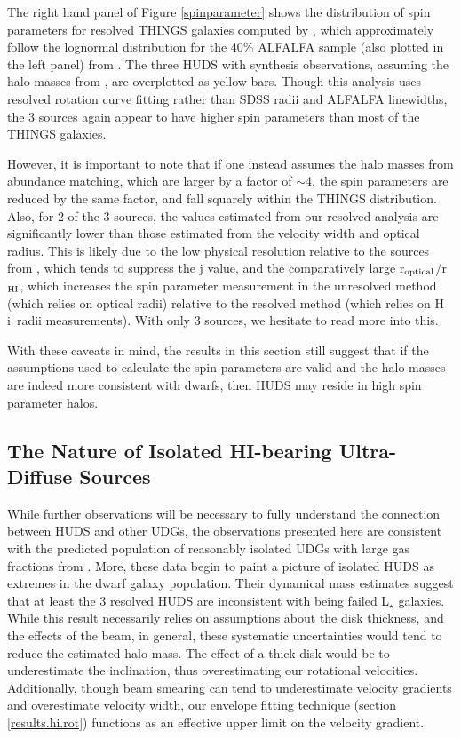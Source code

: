 \documentclass[twocolumn]{aastex6}
\newcommand{\hi}{H{\sc\,i}}
\begin{document}
The right hand panel of Figure \ref{spinparameter} shows the distribution of spin parameters for resolved THINGS galaxies computed by \cite{hallenbeck14a}, which approximately follow the lognormal distribution for the 40\% ALFALFA sample (also plotted in the left panel) from \cite{huang12b}.  The three HUDS with synthesis observations, assuming the halo masses from \cite{dicintio16a}, are overplotted as yellow bars. Though this analysis uses resolved rotation curve fitting rather than SDSS radii and ALFALFA linewidths, the 3 sources again appear to have higher spin parameters than most of the THINGS galaxies. 

However, it is important to note that if one instead assumes the halo masses from abundance matching, which are larger by a factor of $\sim$4, the spin parameters are reduced by the same factor, and fall squarely within the THINGS distribution. Also, for 2 of the 3 sources, the values estimated from our resolved analysis are significantly lower than those estimated from the velocity width and optical radius. This is likely due to the low physical resolution relative to the sources from \cite{hallenbeck14a}, which tends to suppress the j value, and the comparatively large r$_{\rm optical}$/r$_{\rm HI}$, which increases the spin parameter measurement in the unresolved method (which relies on optical radii) relative to the resolved method (which relies on \hi\ radii measurements). With only 3 sources, we hesitate to read more into this.

With these caveats in mind, the results in this section still suggest that if the assumptions used to calculate the spin parameters are valid and the halo masses are indeed more consistent with dwarfs, then HUDS may reside in high spin parameter halos.

\subsection{The Nature of Isolated HI-bearing Ultra-Diffuse Sources}

While further observations will be necessary to fully understand the connection between HUDS and other UDGs, the observations presented here 
are consistent with the predicted population of reasonably isolated UDGs with large gas fractions from \cite{dicintio16a}. %
More, these data begin to paint a picture of isolated HUDS as extremes in the dwarf galaxy population. Their dynamical mass estimates suggest that at least the 3 resolved HUDS are inconsistent with being failed L$_{\star}$ galaxies. While this result necessarily relies on assumptions about the disk thickness, and the effects of the beam, in general,  these systematic uncertainties would tend to reduce the estimated halo mass. The effect of a thick disk would be to underestimate the inclination, thus overestimating our rotational velocities. Additionally, though beam smearing can tend to underestimate velocity gradients and overestimate velocity width, our envelope fitting technique (section \ref{results.hi.rot}) functions as an effective upper limit on the velocity gradient. 
\end{document}
